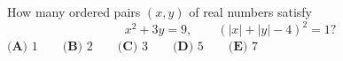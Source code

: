 How many ordered pairs $(x,y)$ of real numbers satisfy
\[x^2+3y=9,\qquad (|x|+|y|-4)^2=1?\]
$\textbf{(A) }1\qquad\textbf{(B) }2\qquad\textbf{(C) }3\qquad\textbf{(D) }5\qquad\textbf{(E) }7$
